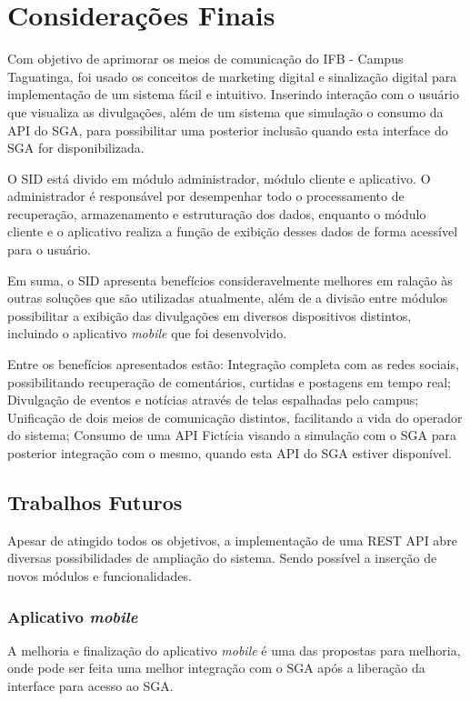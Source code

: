 \chapter[Considerações Finais]{Considerações Finais}
Com objetivo de aprimorar os meios de comunicação do IFB - Campus Taguatinga, foi usado os conceitos de marketing digital e sinalização digital para implementação de um sistema fácil e intuitivo. Inserindo interação com o usuário que visualiza as divulgações, além de um sistema que simulação o consumo da API do SGA, para possibilitar uma posterior inclusão quando esta interface do SGA for disponibilizada.

O SID está divido em módulo administrador, módulo cliente e aplicativo. O administrador é responsável por desempenhar todo o processamento de recuperação, armazenamento e estruturação dos dados, enquanto o módulo cliente e o aplicativo realiza a função de exibição desses dados de forma acessível para o usuário.  

Em suma, o SID apresenta benefícios consideravelmente melhores em ralação às outras soluções que são utilizadas atualmente, além de a divisão entre módulos possibilitar a exibição das divulgações em diversos dispositivos distintos, incluindo o aplicativo \textit{mobile} que foi desenvolvido.

Entre os benefícios apresentados estão: Integração completa com as redes sociais, possibilitando recuperação de comentários, curtidas e postagens em tempo real; Divulgação de eventos e notícias através de telas espalhadas pelo campus; Unificação de dois meios de comunicação distintos, facilitando a vida do operador do sistema; Consumo de uma API Fictícia visando a simulação com o SGA para posterior integração com o mesmo, quando esta API do SGA estiver disponível.

\section{Trabalhos Futuros}
Apesar de atingido todos os objetivos, a implementação de uma REST API abre diversas possibilidades de ampliação do sistema. Sendo possível a inserção de novos módulos e funcionalidades.

\subsection{Aplicativo \textit{mobile}}
A melhoria e finalização do aplicativo \textit{mobile} é uma das propostas para melhoria, onde pode ser feita uma melhor integração com o SGA após a liberação da interface para acesso ao SGA.

